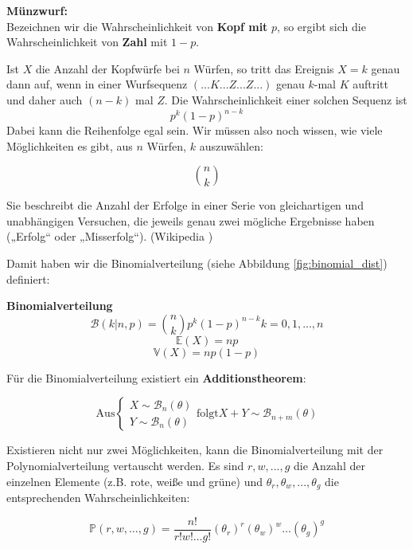 {    \begin{bsp}\textbf{Münzwurf:}\\ 
    Bezeichnen wir die Wahrscheinlichkeit von \textbf{Kopf mit} $p$, so ergibt sich die Wahrscheinlichkeit von 
    \textbf{Zahl} mit $1-p$.

    Ist $X$ die Anzahl der Kopfwürfe bei $n$ Würfen, so tritt das Ereignis $X=k$ genau dann auf, wenn in einer
    Wurfsequenz $(... K ... Z ... Z ...)$ genau $k$-mal $K$ auftritt und daher auch $(n-k)$ mal $Z$. 
    Die Wahrscheinlichkeit einer solchen Sequenz ist 
    \[p^{k}\left(1-p\right)^{n-k}\]
    Dabei kann die Reihenfolge egal sein. Wir müssen also noch wissen, wie viele Möglichkeiten es gibt, 
    aus $n$ Würfen, $k$ auszuwählen:

    \[\binom{n}{k}\]
    \end{bsp}

    Sie beschreibt die Anzahl der Erfolge in einer Serie von gleichartigen und unabhängigen Versuchen, die jeweils genau zwei mögliche Ergebnisse haben („Erfolg“ oder „Misserfolg“). (Wikipedia \cite{wiki:003})

    Damit haben wir die Binomialverteilung (siehe Abbildung \ref{fig:binomial_dist}) definiert:
    \begin{definition}\textbf{Binomialverteilung}
    \[
    \mathcal B\left(k|n,p\right)=
    \binom{n}{k}p^{k}\left(1-p\right)^{n-k}k=0,1,...,n
    \]
    \[\mathbb E\left(X\right)=np\]
    \[\mathbb V\left(X\right)=np(1-p)\]
    \end{definition}

    Für die Binomialverteilung existiert ein \textbf{Additionstheorem}:

    \[\text{Aus}
        \begin{cases}X\sim\mathcal B_n(\theta)\\Y\sim\mathcal B_n(\theta)\end{cases} 
        \text{folgt}X+Y\sim\mathcal B_{n+m}(\theta)\]

    Existieren nicht nur zwei Möglichkeiten, kann die Binomialverteilung mit der Polynomialverteilung
    vertauscht werden. Es sind $r,w,... ,g$ die Anzahl der einzelnen Elemente (z.B. rote, weiße und grüne) und 
    $\theta_{r},\theta_{w},...,\theta_{g}$ die entsprechenden Wahrscheinlichkeiten:

    \[
    \mathbb P\left(r,w,\ldots ,g\right)=
        \frac{n!}{r!w!\ldots g!}\left(\theta_{r}\right)^{r}\left(\theta_{w}\right)^{w}\ldots \left(\theta_{g}\right)^{g}
    \]

}
